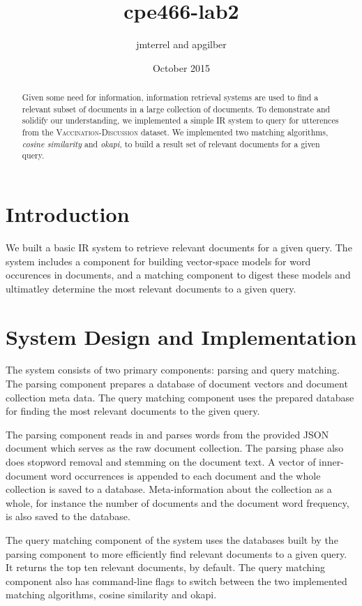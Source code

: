 \documentclass{article}
\title{cpe466-lab2}
\author{jmterrel and apgilber}
\date{October 2015}
\begin{document}
\maketitle

\begin{abstract}
Given some need for information, information retrieval systems are
used to find a relevant subset of documents in a large collection of
documents. To demonstrate and solidify our understanding, we
implemented a simple IR system to query for utterences from the
\textsc{Vaccination-Discussion} dataset. We implemented two matching
algorithms, \textit{cosine similarity} and \textit{okapi}, to build a
result set of relevant documents for a given query.
\end{abstract}

\section{Introduction}
We built a basic IR system to retrieve relevant documents for a given query. The system includes a component for building vector-space models for word occurences in documents, and a matching component to digest these models and ultimatley determine the most relevant documents to a given query.

\section{System Design and Implementation}
The system consists of two primary components: parsing and query matching. The parsing component prepares a database of document vectors and document collection meta data. The query matching component uses the prepared database for finding the most relevant documents to the given query.

The parsing component reads in and parses words from the provided JSON document which serves as the raw document collection. The parsing phase also does stopword removal and stemming on the document text. A vector of inner-document word occurrences is appended to each document and the whole collection is saved to a database. Meta-information about the collection as a whole, for instance the number of documents and the document word frequency, is also saved to the database.

The query matching component of the system uses the databases built by the parsing component to more efficiently find relevant documents to a given query. It returns the top ten relevant documents, by default. The query matching component also has command-line flags to switch between the two implemented matching algorithms, cosine similarity and okapi.
\end{document}
